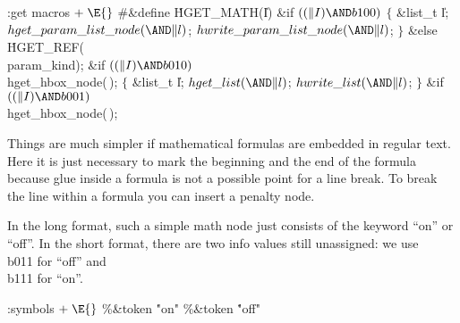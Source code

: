 \Y\B\4:get macros\X${}\mathrel+\E{}$\6
\8\#\&{define} \.{HGET\_MATH}(\|I) \6
\&{if} ${}((\|I)\AND\\{b100}){}$\5
\1${}\{{}$\5
\&{list\_t} \|l;\5
${}\index{hget param list node+\\{hget\_param\_list\_node}}\\{hget\_param\_list\_node}({\AND}\|l){}$;\5
${}\index{hwrite param list node+\\{hwrite\_param\_list\_node}}\\{hwrite\_param\_list\_node}({\AND}\|l){}$;\5
${}\}{}$\2\6
\&{else}\1\5
\.{HGET\_REF}(\\{param\_kind});\2\6
\&{if} ${}((\|I)\AND\\{b010}){}$\1\5
\\{hget\_hbox\_node}(\,);\2\1\6
\4${}\{{}$\5
\&{list\_t} \|l;\5
${}\index{hget list+\\{hget\_list}}\\{hget\_list}({\AND}\|l){}$;\5
${}\index{hwrite list+\\{hwrite\_list}}\\{hwrite\_list}({\AND}\|l){}$;\5
${}\}{}$\2\6
\&{if} ${}((\|I)\AND\\{b001}){}$\1\5
\\{hget\_hbox\_node}(\,);\2
\Y
\fi


Things are much simpler if mathematical formulas are embedded in regular text.
Here it is just necessary to mark the beginning and the end of the formula
because glue inside a formula is not a possible point for a line break.
To break the line within a formula you can insert a penalty node.

In the long format, such a simple math node just consists of the keyword ``on''
or ``off''. In the short format, there are two info values still unassigned:
we use \\{b011} for ``off'' and \\{b111} for ``on''.


\readcode
\Y\par
\par
\Y\B\4:symbols\X${}\mathrel+\E{}$\6
\8\%\&{token} \5\.{"on"}\6
\8\%\&{token} \5\.{"off"}
\Y
\fi

